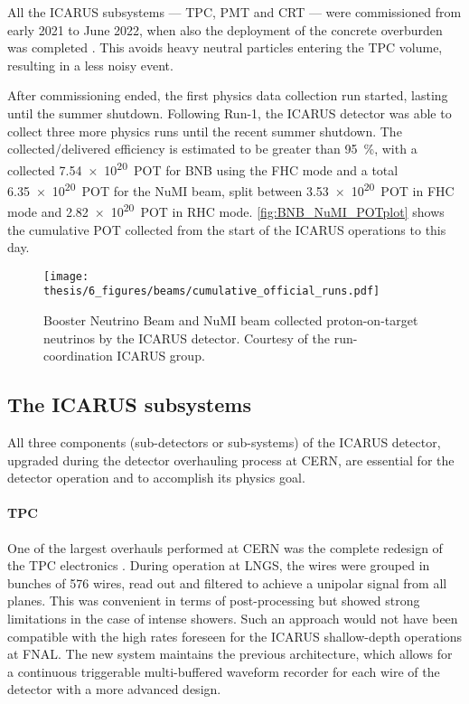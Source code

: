All the ICARUS subsystems --- TPC, PMT and CRT --- were commissioned from early 2021 to June 2022, when also the deployment of the concrete overburden was completed \cite{abratenkoICARUSFermilabShortBaseline2023}. This avoids heavy neutral particles entering the TPC volume, resulting in a less noisy event. 

After commissioning ended, the first physics data collection run started, lasting until the summer shutdown. Following Run-1, the ICARUS detector was able to collect three more physics runs until the recent summer shutdown. The collected/delivered efficiency is estimated to be greater than \SI{95}{\percent}, with a collected \SI{7.54e20}{POT} for BNB using the FHC mode and a total \SI{6.35e20}{POT} for the NuMI beam, split between \SI{3.53e20}{POT} in FHC mode and \SI{2.82e20}{POT} in RHC mode. \autoref{fig:BNB_NuMI_POTplot} shows the cumulative POT collected from the start of the ICARUS operations to this day. 

\begin{figure}
    \centering
    \texttt{[image: thesis/6\_figures/beams/cumulative\_official\_runs.pdf]}
    \caption[BNB and NuMI collected POT]{Booster Neutrino Beam and NuMI beam collected proton-on-target neutrinos by the ICARUS detector. Courtesy of the run-coordination ICARUS group. }
    \label{fig:BNB_NuMI_POTplot}
\end{figure}

\subsection{The ICARUS subsystems} 

All three components (sub-detectors or sub-systems) of the ICARUS detector, upgraded during the detector overhauling process at CERN, are essential for the detector operation and to accomplish its physics goal.

\paragraph{TPC} One of the largest overhauls performed at CERN was the complete redesign of the TPC electronics \cite{bagbyOverhaulInstallationICARUST6002021}. During operation at LNGS, the wires were grouped in bunches of 576 wires, read out and filtered to achieve a unipolar signal from all planes. This was convenient in terms of post-processing but showed strong limitations in the case of intense showers. Such an approach would not have been compatible with the high rates foreseen for the ICARUS shallow-depth operations at FNAL. The new system maintains the previous architecture, which allows for a continuous triggerable  multi-buffered waveform recorder for each wire of the detector with a more advanced design. 

